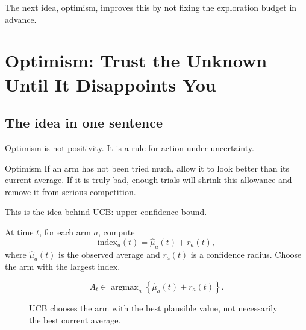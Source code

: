 \documentclass[en,nofont,11pt]{elegantbook}
\providecommand{\argmax}{\mathop{\mathrm{argmax}}}
\begin{document}
The next idea, optimism, improves this by not fixing the exploration budget in advance.

\chapter{Optimism: Trust the Unknown Until It Disappoints You}

\section{The idea in one sentence}

Optimism is not positivity. It is a rule for action under uncertainty.

\begin{plainbox}{Optimism}
If an arm has not been tried much, allow it to look better than its current average. If it is truly bad, enough trials will shrink this allowance and remove it from serious competition.
\end{plainbox}

This is the idea behind UCB: upper confidence bound.

At time $t$, for each arm $a$, compute
\[
\text{index}_a(t)=\widehat\mu_a(t)+r_a(t),
\]
where $\widehat\mu_a(t)$ is the observed average and $r_a(t)$ is a confidence radius. Choose the arm with the largest index.

\[
A_t\in\argmax_a\left\{\widehat\mu_a(t)+r_a(t)\right\}.
\]

\begin{figure}[h]
\centering
{}
\caption{UCB chooses the arm with the best plausible value, not necessarily the best current average.}
\end{figure}
\end{document}
